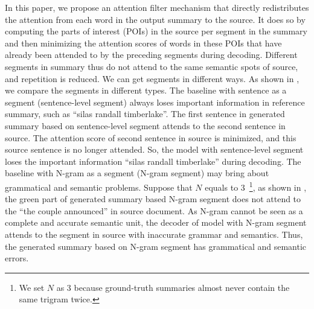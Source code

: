 In this paper, we propose an attention filter mechanism that directly 
redistributes the attention from each word in the output summary to the source. 
It does so by computing the parts of interest (POIs) in the source
per segment in the summary
and then minimizing the attention scores of
words in these POIs that have already been attended to by the preceding 
segments during decoding. 
Different segments in summary thus do not attend to the same semantic spots
of source, and repetition is reduced. 
We can get segments in different ways.
As shown in , we compare the segments in different types.
The baseline with sentence as a segment (sentence-level segment) 
always loses important information in reference summary, such as ``silas randall timberlake''.
The first sentence in generated summary based on sentence-level segment attends to 
the second sentence in source. 
The attention score of second sentence in source is minimized,
and this source sentence is no longer attended. 
So, the model with sentence-level segment loses the important information ``silas randall timberlake''
during decoding.
The baseline with N-gram as a segment (N-gram segment) may bring about grammatical and semantic problems.
Suppose that $N$ equals to 3~\footnote{We set $N$ as 3 because ground-truth summaries almost never contain the same trigram twice.}, 
as shown in ,
the green part of generated summary based N-gram segment does not attend to the ``the couple announced''
in source document. 
As N-gram cannot be seen as a complete and accurate semantic unit,
the decoder of model with N-gram segment attends to the segment in source with inaccurate grammar and semantics.
Thus, the generated summary based on N-gram segment has grammatical and semantic errors.
